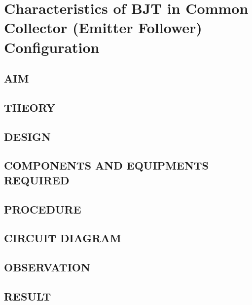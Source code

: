 \chapter[Characteristics of BJT in Common Collector Configuration]{Characteristics of BJT in Common Collector (Emitter Follower) Configuration}

\section*{AIM}
\section*{THEORY}
\section*{DESIGN}
\section*{COMPONENTS AND EQUIPMENTS REQUIRED}
\section*{PROCEDURE}
\section*{CIRCUIT DIAGRAM}
\section*{OBSERVATION}
\section*{RESULT}
